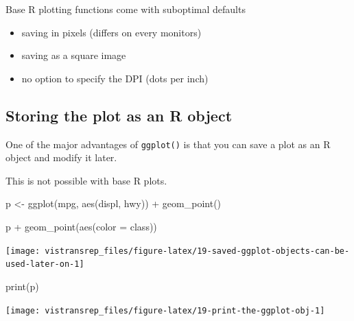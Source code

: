 \documentclass[]{book}
\newenvironment{Shaded}{}{}
\newcommand{\DataTypeTok}[1]{#1}
\newcommand{\KeywordTok}[1]{\textcolor[rgb]{0.00,0.00,1.00}{#1}}
\newcommand{\NormalTok}[1]{#1}
\newcommand{\OperatorTok}[1]{#1}
\newcommand{\StringTok}[1]{\textcolor[rgb]{0.00,0.50,0.50}{#1}}
\begin{document}
Base R plotting functions come with suboptimal defaults

\begin{itemize}
\item
  saving in pixels (differs on every monitors)
\item
  saving as a square image
\item
  no option to specify the DPI (dots per inch)
\end{itemize}

\hypertarget{storing-the-plot-as-an-r-object}{%
\subsection{Storing the plot as an R object}\label{storing-the-plot-as-an-r-object}}

One of the major advantages of \texttt{ggplot()} is that you can save a plot as an R object and modify it later.

This is not possible with base R plots.

\begin{Shaded}
\begin{Highlighting}[]
\NormalTok{p <-}\StringTok{ }\KeywordTok{ggplot}\NormalTok{(mpg, }\KeywordTok{aes}\NormalTok{(displ, hwy)) }\OperatorTok{+}
\StringTok{  }\KeywordTok{geom_point}\NormalTok{()}
\end{Highlighting}
\end{Shaded}

\begin{Shaded}
\begin{Highlighting}[]
\NormalTok{p }\OperatorTok{+}\StringTok{ }\KeywordTok{geom_point}\NormalTok{(}\KeywordTok{aes}\NormalTok{(}\DataTypeTok{color =}\NormalTok{ class))}
\end{Highlighting}
\end{Shaded}

\begin{flushright}\texttt{[image: vistransrep\_files/figure-latex/19-saved-ggplot-objects-can-be-used-later-on-1]} \end{flushright}

\begin{Shaded}
\begin{Highlighting}[]
\KeywordTok{print}\NormalTok{(p)}
\end{Highlighting}
\end{Shaded}

\begin{flushright}\texttt{[image: vistransrep\_files/figure-latex/19-print-the-ggplot-obj-1]} \end{flushright}
\end{document}
